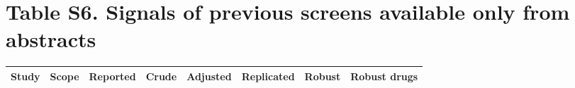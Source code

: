 \documentclass[10pt]{article}
\begin{document}
\section*{Table S6. Signals of previous screens available only from abstracts}
\begin{longtable}{llrrrrrp{6cm}}
\toprule
Study & Scope & Reported & Crude & Adjusted & Replicated & Robust & Robust drugs \\
\midrule
\bottomrule
\end{longtable}
\end{document}
